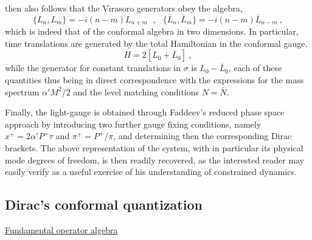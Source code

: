 \documentclass[a4paper,11pt]{article}
\begin{document}
then also follows that the Virasoro generators obey the algebra,
\begin{equation}
\{L_n,L_m\}=-i(n-m)L_{n+m}\ \ \ ,\ \ \ 
\{\bar{L}_n,\bar{L}_m\}=-i(n-m)\bar{L}_{n-m}\ ,
\end{equation}
which is indeed that of the conformal algebra in two dimensions.
In particular, time translations are generated by the total Hamiltonian
in the conformal gauge,
\begin{equation}
H=2[L_0+\bar{L}_0]\ ,
\end{equation}
while the generator for constant translations in $\sigma$ is $L_0-\bar{L}_0$,
each of these quantities thus being in direct correspondence with the
expressions for the mass spectrum $\alpha'M^2/2$ and the level matching
conditions $N=\bar{N}$.

Finally, the light-gauge is obtained through Faddeev's reduced phase
space approach by introducing two further gauge fixing conditions,
namely $x^+=2\alpha' P^+\tau$ and $\pi^+=P^+/\pi$, and determining then
the corresponding Dirac brackets. The above representation of the system,
with in particular its physical mode degrees of freedom, is then readily
recovered, as the interested reader may easily verify as a useful exercise
of his understanding of constrained dynamics.

\subsection{Dirac's conformal quantization}
\label{Subsect7.4}

\vspace{5pt}

\noindent\underline{Fundamental operator algebra}

\vspace{10pt}
\end{document}
